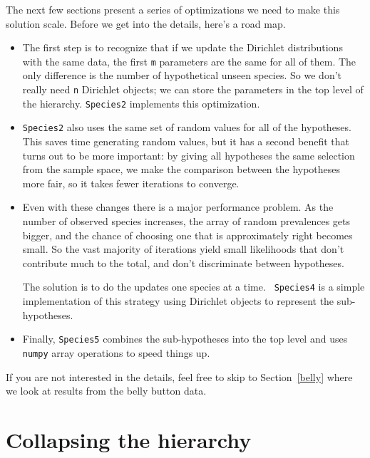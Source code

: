 \documentclass[12pt]{book}
\theoremstyle{exercise}
\begin{document}
The next few sections present a series of optimizations we need to
make this solution scale.  Before we get into the details, here's
a road map.

\begin{itemize}

\item The first step is to recognize that if we update the Dirichlet
  distributions with the same data, the first {\tt m} parameters are
  the same for all of them.  The only difference is the number of
  hypothetical unseen species.  So we don't really need {\tt n}
  Dirichlet objects; we can store the parameters in the top level of
  the hierarchy.  {\tt Species2} implements this optimization.

\item {\tt Species2} also uses the same set of random values for all
  of the hypotheses.  This saves time generating random values, but it
  has a second benefit that turns out to be more important: by giving
  all hypotheses the same selection from the sample space, we make
  the comparison between the hypotheses more fair, so it takes
  fewer iterations to converge.

\item Even with these changes there is a major performance problem.
  As the number of observed species increases, the array of random
  prevalences gets bigger, and the chance of choosing one that is
  approximately right becomes small.  So the vast majority of
  iterations yield small likelihoods that don't contribute much to the
  total, and don't discriminate between hypotheses.

  The solution is to do the updates one species at a time.  {\tt
  Species4} is a simple implementation of this strategy using
  Dirichlet objects to represent the sub-hypotheses.

\item Finally, {\tt Species5} combines the sub-hypotheses into the top
  level and uses {\tt numpy} array operations to speed things up.

\end{itemize}

If you are not interested in the details, feel free to skip to
Section~\ref{belly} where we look at results from the belly
button data.


\section{Collapsing the hierarchy}
\label{collapsing}
\end{document}
